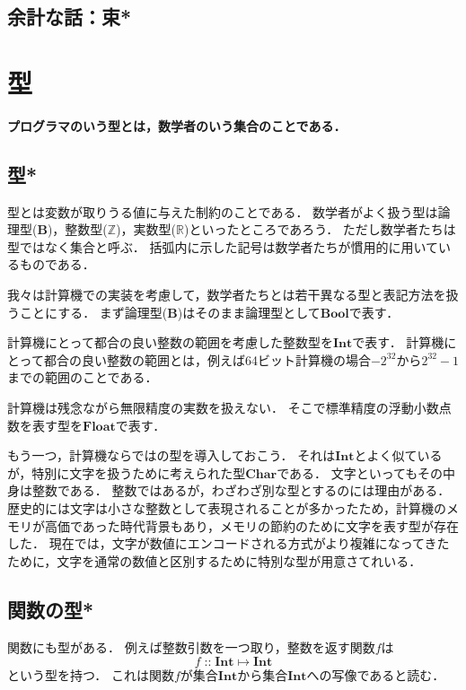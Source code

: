 \documentclass[twocolumn]{jsbook}
\newenvironment{leader}{\begingroup\bf}{\endgroup}
\newcommand{\hsklType}[1]{\textbf{#1}}
\newcommand{\hsklBool}{\hsklType{Bool}}
\newcommand{\hsklChar}{\hsklType{Char}}
\newcommand{\hsklInt}{\hsklType{Int}}
\newcommand{\hsklFloat}{\hsklType{Float}}
\DeclareMathOperator{\mathIn}{::}
\DeclareMathOperator{\mathMapsTo}{\mapsto}
\newcommand{\mathSet}[1]{\mathbf{#1}}
\newcommand{\mathSpecialSet}[1]{\mathbb{#1}}
\newcommand{\mathMorph}[2]{#1\mathMapsTo#2}
\begin{document}
\section{余計な話：束*}

\chapter{型}


\begin{leader}
プログラマのいう型とは，数学者のいう集合のことである．
\end{leader}


\section{型*}

型とは変数が取りうる値に与えた制約のことである．
数学者がよく扱う型は論理型($\mathSet{B}$)，整数型($\mathSpecialSet{Z}$)，実数型($\mathSpecialSet{R}$)といったところであろう．
ただし数学者たちは型ではなく集合と呼ぶ．
括弧内に示した記号は数学者たちが慣用的に用いているものである．

我々は計算機での実装を考慮して，数学者たちとは若干異なる型と表記方法を扱うことにする．
まず論理型($\mathSet{B}$)はそのまま論理型として$\hsklBool$で表す．

計算機にとって都合の良い整数の範囲を考慮した整数型を$\hsklInt$で表す．
計算機にとって都合の良い整数の範囲とは，例えば64ビット計算機の場合$-2^{32}$から$2^{32}-1$までの範囲のことである．

計算機は残念ながら無限精度の実数を扱えない．
そこで標準精度の浮動小数点数を表す型を$\hsklFloat$で表す．

もう一つ，計算機ならではの型を導入しておこう．
それは$\hsklInt$とよく似ているが，特別に文字を扱うために考えられた型$\hsklChar$である．
文字といってもその中身は整数である．
整数ではあるが，わざわざ別な型とするのには理由がある．
歴史的には文字は小さな整数として表現されることが多かったため，計算機のメモリが高価であった時代背景もあり，メモリの節約のために文字を表す型が存在した．
現在では，文字が数値にエンコードされる方式がより複雑になってきたために，文字を通常の数値と区別するために特別な型が用意さてれいる．



\section{関数の型*}

関数にも型がある．
例えば整数引数を一つ取り，整数を返す関数$f$は$$f\mathIn\mathMorph{\hsklInt}{\hsklInt}$$という型を持つ．
これは関数$f$が集合$\hsklInt$から集合$\hsklInt$への写像であると読む．
\end{document}
